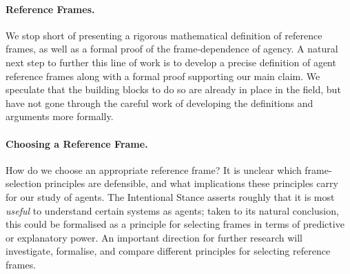 \documentclass[11pt]{article} %
\begin{document}
%
\paragraph{Reference Frames.} We stop short of presenting a rigorous mathematical definition of reference frames, as well as a formal proof of the frame-dependence of agency. A natural next step to further this line of work is to develop a precise definition of agent reference frames along with a formal proof supporting our main claim. We speculate that the building blocks to do so are already in place in the field, but have not gone through the careful work of developing the definitions and arguments more formally.


%
\paragraph{Choosing a Reference Frame.} How do we choose an appropriate reference frame? It is unclear which frame-selection principles are defensible, and what implications these principles carry for our study of agents. The Intentional Stance \citep{dennett1989intentional} asserts roughly that it is most \textit{useful} to understand certain systems as agents; taken to its natural conclusion, this could be formalised as a principle for selecting frames in terms of predictive or explanatory power. An important direction for further research will investigate, formalise, and compare different principles for selecting reference frames. 


\end{document}
